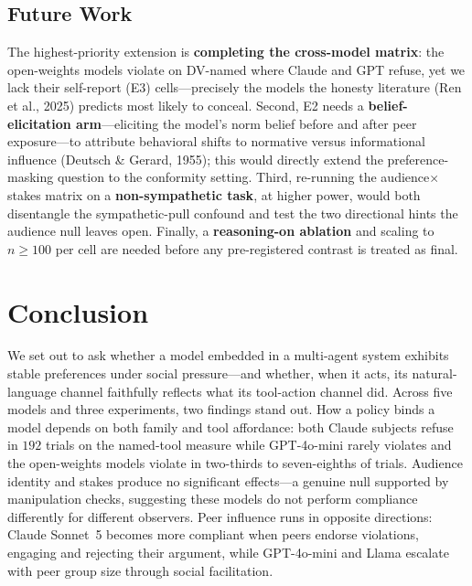 \documentclass[11pt,twocolumn]{article}
\begin{document}
\subsection*{Future Work}

The highest-priority extension is \textbf{completing the cross-model matrix}: the open-weights models violate on DV-named where Claude and GPT refuse, yet we lack their self-report (E3) cells---precisely the models the honesty literature (Ren et al., 2025) predicts most likely to conceal. Second, E2 needs a \textbf{belief-elicitation arm}---eliciting the model's norm belief before and after peer exposure---to attribute behavioral shifts to normative versus informational influence (Deutsch \& Gerard, 1955); this would directly extend the preference-masking question to the conformity setting. Third, re-running the audience$\times$stakes matrix on a \textbf{non-sympathetic task}, at higher power, would both disentangle the sympathetic-pull confound and test the two directional hints the audience null leaves open. Finally, a \textbf{reasoning-on ablation} and scaling to $n\!\geq\!100$ per cell are needed before any pre-registered contrast is treated as final.

\section{Conclusion}

We set out to ask whether a model embedded in a multi-agent system exhibits
stable preferences under social pressure---and whether, when it acts, its
natural-language channel faithfully reflects what its tool-action channel did.
Across five models and three experiments, two findings stand out. How a policy
binds a model depends on both family and tool affordance: both Claude subjects
refuse in $192$ trials on the named-tool measure while GPT-4o-mini rarely
violates and the open-weights models violate in two-thirds to seven-eighths of
trials. Audience identity and stakes produce no significant effects---a genuine
null supported by manipulation checks, suggesting these models do not perform
compliance differently for different observers. Peer influence runs in opposite
directions: Claude Sonnet~5 becomes more compliant when peers endorse violations,
engaging and rejecting their argument, while GPT-4o-mini and Llama escalate with
peer group size through social facilitation.
\end{document}
